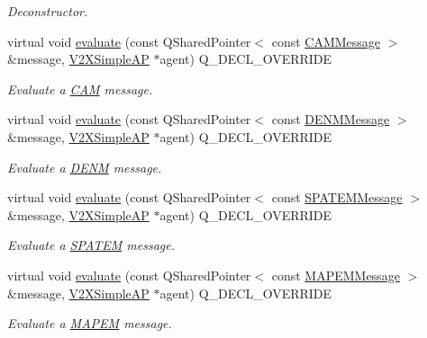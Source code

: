 \begin{DoxyCompactItemize}
\begin{DoxyCompactList}\small\item\em Deconstructor. \end{DoxyCompactList}\item 
virtual void \hyperlink{classFlourishVehicleRulesEngine_a0c4060913c82b831e89528d13649d0cc}{evaluate} (const Q\+Shared\+Pointer$<$ const \hyperlink{classCAMMessage}{C\+A\+M\+Message} $>$ \&message, \hyperlink{classV2XSimpleAP}{V2\+X\+Simple\+AP} $\ast$agent) Q\+\_\+\+D\+E\+C\+L\+\_\+\+O\+V\+E\+R\+R\+I\+DE
\begin{DoxyCompactList}\small\item\em Evaluate a \hyperlink{structCAM}{C\+AM} message. \end{DoxyCompactList}\item 
virtual void \hyperlink{classFlourishVehicleRulesEngine_a46c306791b362a6f2db46daf205506bd}{evaluate} (const Q\+Shared\+Pointer$<$ const \hyperlink{classDENMMessage}{D\+E\+N\+M\+Message} $>$ \&message, \hyperlink{classV2XSimpleAP}{V2\+X\+Simple\+AP} $\ast$agent) Q\+\_\+\+D\+E\+C\+L\+\_\+\+O\+V\+E\+R\+R\+I\+DE
\begin{DoxyCompactList}\small\item\em Evaluate a \hyperlink{structDENM}{D\+E\+NM} message. \end{DoxyCompactList}\item 
virtual void \hyperlink{classFlourishVehicleRulesEngine_af46f952ea4b4aa841a3f4efe906a411d}{evaluate} (const Q\+Shared\+Pointer$<$ const \hyperlink{classSPATEMMessage}{S\+P\+A\+T\+E\+M\+Message} $>$ \&message, \hyperlink{classV2XSimpleAP}{V2\+X\+Simple\+AP} $\ast$agent) Q\+\_\+\+D\+E\+C\+L\+\_\+\+O\+V\+E\+R\+R\+I\+DE
\begin{DoxyCompactList}\small\item\em Evaluate a \hyperlink{structSPATEM}{S\+P\+A\+T\+EM} message. \end{DoxyCompactList}\item 
virtual void \hyperlink{classFlourishVehicleRulesEngine_a88a79d4cca8d118f2ce888d87f59f33c}{evaluate} (const Q\+Shared\+Pointer$<$ const \hyperlink{classMAPEMMessage}{M\+A\+P\+E\+M\+Message} $>$ \&message, \hyperlink{classV2XSimpleAP}{V2\+X\+Simple\+AP} $\ast$agent) Q\+\_\+\+D\+E\+C\+L\+\_\+\+O\+V\+E\+R\+R\+I\+DE
\begin{DoxyCompactList}\small\item\em Evaluate a \hyperlink{structMAPEM}{M\+A\+P\+EM} message. \end{DoxyCompactList}\end{DoxyCompactItemize}


